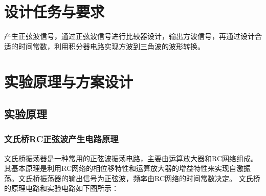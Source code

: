 \documentclass[10pt, a4paper]{article} %
\begin{document}
\section{设计任务与要求}

产生正弦波信号，通过正弦波信号进行比较器设计，输出方波信号，再通过设计合适的时间常数，利用积分器电路实现方波到三角波的波形转换。

\section{实验原理与方案设计}
\subsection{实验原理}
\subsubsection{文氏桥RC正弦波产生电路原理}
文氏桥振荡器是一种常用的正弦波振荡电路，主要由运算放大器和RC网络组成。其基本原理是利用RC网络的相位移特性和运算放大器的增益特性来实现自激振荡。文氏桥振荡器的输出信号为正弦波，频率由RC网络的时间常数决定。
文氏桥的原理电路和实验电路如下图所示：
\end{document}
